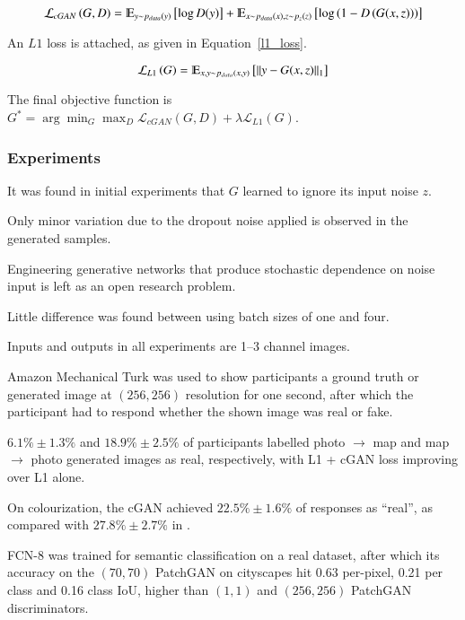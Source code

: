 \documentclass[a4paper, 12pt]{article}
\DeclarePairedDelimiter\norm{\lVert}{\rVert}%
\begin{document}
\begin{equation}
        \mathcal{L}_{cGAN}\left(G, D\right) =
                \varmathbb{E}_{y \sim p_{data}(y)}\left[\log D(y)\right] +
                \varmathbb{E}_{x \sim p_{data}(x), z \sim p_z (z)}\left[\log \left(1 - D\left(G(x, z)\right)\right)\right]
        \label{discrim_no_condition_eqn}
\end{equation}

An $L1$ loss is attached, as given in Equation~\ref{l1_loss}.

\begin{equation}
        \mathcal{L}_{L1}\left(G\right) = \varmathbb{E}_{x, y \sim p_{data}(x, y)}\left[\norm{y - G(x, z)}_1\right]
        \label{l1_loss}
\end{equation}

The final objective function is
$G^* = \arg\min_G \max_D \mathcal{L}_{cGAN}\left(G, D\right) + \lambda \mathcal{L}_{L1}\left(G\right)$.

\subsubsection{Experiments}

It was found in initial experiments that $G$ learned to ignore its input noise
$z$.

Only minor variation due to the dropout noise applied is observed in the
generated samples.

Engineering generative networks that produce stochastic dependence on noise
input is left as an open research problem.

Little difference was found between using batch sizes of one and four.

Inputs and outputs in all experiments are 1--3 channel images.

Amazon Mechanical Turk was used to show participants a ground truth or
generated image at $(256, 256)$ resolution for one second, after which the
participant had to respond whether the shown image was real or fake.

$6.1\% \pm 1.3\%$ and $18.9\% \pm 2.5\%$ of participants labelled photo
$\rightarrow$ map and map $\rightarrow$ photo generated images as real,
respectively, with L1 + cGAN loss improving over L1 alone.

On colourization, the cGAN achieved $22.5\% \pm 1.6\%$ of responses as
``real'', as compared with $27.8\% \pm 2.7\%$ in
\citet{DBLP:journals/corr/ZhangIE16}.

FCN-8 was trained for semantic classification on a real dataset, after which
its accuracy on the $(70, 70)$ PatchGAN on cityscapes hit 0.63 per-pixel, 0.21 per
class and 0.16 class IoU, higher than $(1, 1)$ and $(256, 256)$ PatchGAN
discriminators.
\end{document}
